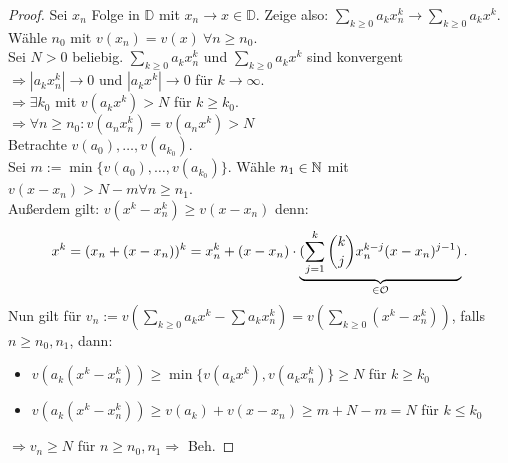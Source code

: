 \begin{proof}
Sei $x_n$ Folge in $\mathbb{D}$ mit $x_n \to x \in \mathbb{D}$. Zeige also: $\sum_{k \geq 0} a_k x^k_n \to \sum_{k \geq 0} a_k x^k$.\\
Wähle $n_0$ mit $v(x_n)=v(x) \ \forall n \geq n_0$.\\
Sei $N >0$ beliebig. $\sum_{k \geq 0} a_k x^k_n$ und $\sum_{k \geq 0} a_k x^k$ sind konvergent\\
$\Rightarrow |a_kx^k_n| \to 0$ und $|a_kx^k| \to 0$ für $k \to \infty$.\\
$\Rightarrow \exists k_0$ mit $v(a_kx^k) >N$ für $k \geq k_0$.\\
$\Rightarrow \forall n \geq n_0: v(a_nx_n^k)=v(a_nx^k)>N$\\
Betrachte $v(a_0), \dots, v(a_{k_0})$.\\
Sei $m:= \min\{v(a_0), \dots, v(a_{k_0})\}$. Wähle $n_1 \in \mathbb{N}$ mit $v(x-x_n)>N-m \forall n \geq n_1$.\\
Außerdem gilt: $v(x^k-x_n^k) \geq v(x-x_n)$ denn:\\
\[x^k=(x_n+(x-x_n))^k=x_n^k+(x-x_n) \cdot \underbrace{(\sum_{j=1}^k {k \choose j} x_n^{k-j} (x-x_n)^{j-1})}_{\in \mathcal{O}}.\]
Nun gilt für $v_n:=v(\sum_{k \geq 0} a_k x^k - \sum a_k x_n^k)=v(\sum_{k \geq 0} (x^k-x^k_n))$, falls $n \geq n_0, n_1$, dann:
\begin{itemize}
\item $v(a_k(x^k-x_n^k)) \geq \min \{v(a_kx^k), v(a_kx_n^k)\} \geq N$ für $k \geq k_0$
\item $v(a_k(x^k-x_n^k)) \geq v(a_k)+v(x-x_n) \geq m +N - m =N$ für $k \leq k_0$
\end{itemize} 
$\Rightarrow v_n \geq N$ für $n \geq n_0, n_1 \Rightarrow$ Beh.
\end{proof}

